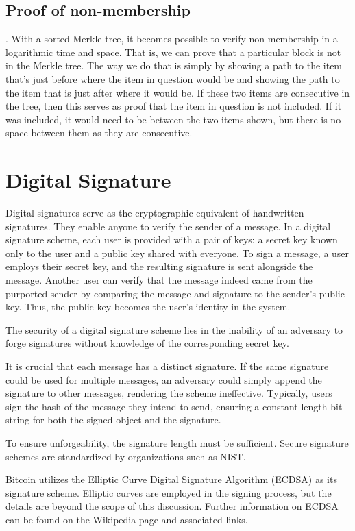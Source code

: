 \subsection*{Proof of non‐membership}.
With a sorted Merkle tree, it becomes possible to verify non‐membership in a logarithmic time and space. That is, we can prove that a particular block is not in the Merkle tree. The way we do that is simply by showing a path to the item that’s just before where the item in question would be and showing the path to the item that is just after where it would be. If these two items are consecutive in the tree, then this serves as proof that the item in question is not included. If it was included, it would need to be between the two items shown, but there is no space between them as they are consecutive.
\section{Digital Signature}
Digital signatures serve as the cryptographic equivalent of handwritten signatures. They enable anyone to verify the sender of a message. In a digital signature scheme, each user is provided with a pair of keys: a secret key known only to the user and a public key shared with everyone.
To sign a message, a user employs their secret key, and the resulting signature is sent alongside the message. Another user can verify that the message indeed came from the purported sender by comparing the message and signature to the sender's public key. Thus, the public key becomes the user's identity in the system.

The security of a digital signature scheme lies in the inability of an adversary to forge signatures without knowledge of the corresponding secret key.

It is crucial that each message has a distinct signature. If the same signature could be used for multiple messages, an adversary could simply append the signature to other messages, rendering the scheme ineffective. Typically, users sign the hash of the message they intend to send, ensuring a constant-length bit string for both the signed object and the signature.

To ensure unforgeability, the signature length must be sufficient. Secure signature schemes are standardized by organizations such as NIST.

Bitcoin utilizes the Elliptic Curve Digital Signature Algorithm (ECDSA) as its signature scheme. Elliptic curves are employed in the signing process, but the details are beyond the scope of this discussion. Further information on ECDSA can be found on the Wikipedia page and associated links.

